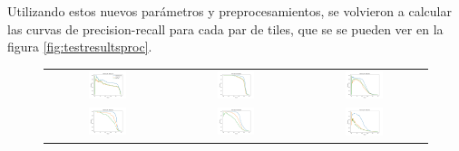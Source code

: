 Utilizando estos nuevos parámetros y preprocesamientos, se volvieron a calcular las curvas de precision-recall para cada par de tiles, que se se pueden ver en la figura \ref{fig:testresultsproc}. 

\begin{figure}[h!]
\begin{center}

\begin{tabular}{ccc}

\includegraphics[width=0.32\textwidth]{Kap4/best-train=b278test=b234.png} &
\includegraphics[width=0.32\textwidth]{Kap4/best-train=b278test=b261.png} &
\includegraphics[width=0.32\textwidth]{Kap4/best-train=b278test=b360.png} \\

\includegraphics[width=0.32\textwidth]{Kap4/best-train=b234test=b261.png} &
\includegraphics[width=0.32\textwidth]{Kap4/best-train=b234test=b278.png} &
\includegraphics[width=0.32\textwidth]{Kap4/best-train=b234test=b360.png} \\


\end{tabular}
\end{center}
\end{figure}
